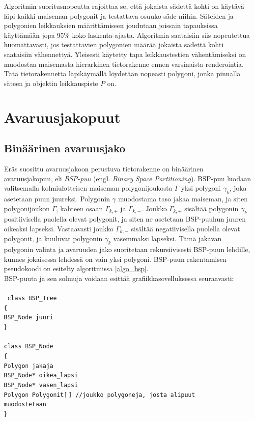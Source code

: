 \documentclass[a4paper,12pt, titlepage]{article}
\theoremstyle{break}
\newcommand{\tab}[1][0.5cm]{\hspace*{#1}} %
\newcommand{\code}[1]{\texttt{#1}} %
\begin{document}


Algoritmin suoritusnopeutta rajoittaa se, että jokaista sädettä kohti on käytävä läpi kaikki maiseman polygonit ja testattava osuuko säde niihin. Säteiden ja polygonien leikkauksien määrittämiseen joudutaan joissain tapauksissa käyttämään jopa 95\% koko laskenta-ajasta.\cite{whitted} Algoritmia saataisiin siis nopeutettua huomattavasti, jos testattavien polygonien määrää jokaista sädettä kohti saataisiin vähennettyä. Yleisesti käytetty tapa leikkaustestien vähentämiseksi on muodostaa maisemasta hierarkinen tietorakenne ennen varsinaista renderointia. Tätä tietorakennetta läpikäymällä löydetään nopeasti polygoni, jonka pinnalla säteen ja objektin leikkauspiste $P$ on.\cite{rubin}


\newpage
\section{Avaruusjakopuut}
\subsection{Binäärinen avaruusjako}

Eräs suosittu avaruusjakoon perustuva tietorakenne on binäärinen avaruusjakopuu, eli \emph{BSP-puu} (engl. \emph{Binary Space Partitioning}). BSP-puu luodaan valitsemalla kolmiulotteisen maiseman  polygonijoukosta $\Gamma$ yksi polygoni $\gamma_k$, joka asetetaan puun juureksi. Polygonin $\gamma$ muodostama taso jakaa maiseman, ja siten polygonijoukon $\Gamma$, kahteen osaan $\Gamma_{k,+}$ ja $\Gamma_{k,-}$. Joukko $\Gamma_{k,+}$ sisältää polygonin $\gamma_k$ positiivisella puolella olevat polygonit, ja siten ne asetetaan BSP-puuhun juuren oikeaksi lapseksi. Vastaavasti joukko $\Gamma_{k,-}$ sisältää negatiivisella puolella olevat polygonit, ja kuuluvat polygonin $\gamma_k$ vasemmaksi lapseksi. Tämä jakavan polygonin valinta ja avaruuden jako suoritetaan rekursiivisesti BSP-puun lehdille, kunnes jokaisessa lehdessä on vain yksi polygoni.\cite{samet} BSP-puun rakentamisen pseudokoodi on esitelty algoritmissa \ref{algo_bsp}.\\

BSP-puuta ja sen solmuja voidaan esittää grafiikkasovelluksessa seuraavasti:\\\\%
\code{
class BSP\_Tree\\
\{\\
\tab BSP\_Node juuri\\
\}\\\\
class BSP\_Node\\
\{\\
\tab Polygon jakaja\\
\tab BSP\_Node* oikea\_lapsi\\
\tab BSP\_Node* vasen\_lapsi\\
\tab Polygon Polygonit[$\,$] \tab //joukko polygoneja, josta alipuut\\ 
\hspace*{5.65cm} muodostetaan\\
\}\\}
\end{document}
